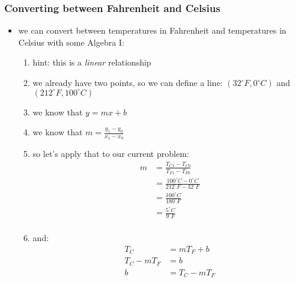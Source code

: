 \documentclass[11pt, oneside]{article}   	%
\begin{document}
\subsubsection{Converting between Fahrenheit and Celsius}
\begin{itemize}
\item we can convert between temperatures in Fahrenheit and temperatures in Celsius with some Algebra I:
\begin{enumerate}
\item hint: this is a \emph{linear} relationship
\item we already have two points, so we can define a line: $(32^{\circ} F, 0^{\circ}C)$ and $(212^{\circ} F, 100^{\circ} C)$
\item we know that $y = mx + b$
\item we know that $m = \frac{y_1 - y_0}{x_1 - x_0}$
\item so let's apply that to our current problem:
\begin{equation} 
\boxed{
\begin{split}
    m      &= \frac{T_{C1} - T_{C0}}{T_{F1} - T_{F0}}  \\
             &= \frac{100^{\circ}C - 0^{\circ}C}{212^{\circ} F - 32^{\circ} F} \\
             &= \frac{100^{\circ}C}{180^{\circ} F} \\
             &= \frac{5^{\circ}C}{9^{\circ} F} \\
 \end{split}
 }
\end{equation}

\item and:
\begin{equation} 
\boxed{
\begin{split}
   T_C   &= m T_F + b \\ 
   T_C - m T_F &= b \\ 
   b &= T_C - m T_F \\
 \end{split}
 }
\end{equation}


\end{enumerate}
\end{itemize}
\end{document}
